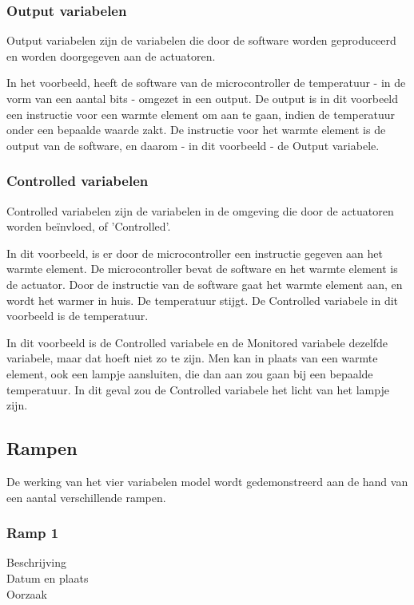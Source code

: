 \documentclass{article}
\begin{document}
			\subsubsection{Output variabelen}
			
			Output variabelen zijn de variabelen die door de software worden geproduceerd en worden doorgegeven aan de actuatoren.

			In het voorbeeld, heeft de software van de microcontroller de temperatuur - in de vorm van een aantal bits - omgezet in een output. De output is in dit voorbeeld een instructie voor een warmte element om aan te gaan, indien de temperatuur onder een bepaalde waarde zakt. De instructie voor het warmte element is de output van de software, en daarom - in dit voorbeeld - de Output variabele.

			\subsubsection{Controlled variabelen}

			Controlled variabelen zijn de variabelen in de omgeving die door de actuatoren worden beïnvloed, of 'Controlled'.

			In dit voorbeeld, is er door de microcontroller een instructie gegeven aan het warmte element. De microcontroller bevat de software en het warmte element is de actuator. Door de instructie van de software gaat het warmte element aan, en wordt het warmer in huis. De temperatuur stijgt. De Controlled variabele in dit voorbeeld is de temperatuur.

			
			In dit voorbeeld is de Controlled variabele en de Monitored variabele dezelfde variabele, maar dat hoeft niet zo te zijn. Men kan in plaats van een warmte element, ook een lampje aansluiten, die dan aan zou gaan bij een bepaalde temperatuur. In dit geval zou de Controlled variabele het licht van het lampje zijn.
		
		\subsection{Rampen}
		
		De werking van het vier variabelen model wordt gedemonstreerd aan de hand van een aantal verschillende rampen.
		
			\subsubsection{Ramp 1}
			\begin{description}
			\item[Beschrijving]
			\item[Datum en plaats] 
			\item[Oorzaak]
			\end{description}
			
\end{document}
